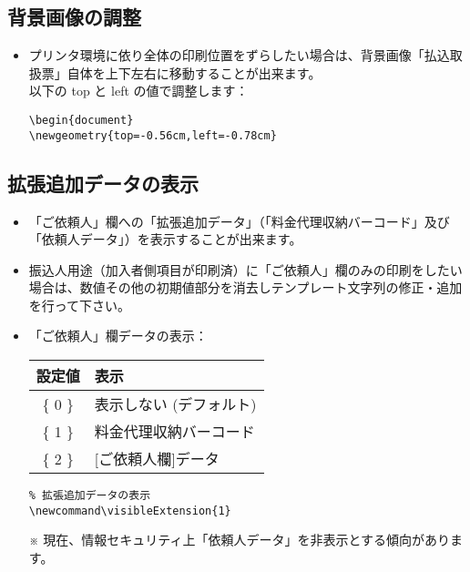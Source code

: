 \documentclass[a4paper,10pt,titlepage]{ltjsarticle}
\def\colH#1{\color[HTML]{#1}}
\newcommand\visibleExtension{1}
\begin{document}
\subsection{背景画像の調整}
\begin{itemize}
  \item プリンタ環境に依り全体の印刷位置をずらしたい場合は、背景画像「払込取扱票」自体を上下左右に移動することが出来ます。\\
以下の {\colH{800000} top} と {\colH{800000} left} の値で調整します：
\begin{verbatim}
\begin{document}
\newgeometry{top=-0.56cm,left=-0.78cm}
\end{verbatim}
  
\end{itemize}

\subsection{拡張追加データの表示}

\begin{itemize}
   \item 「ご依頼人」欄への「拡張追加データ」（「料金代理収納バーコード」及び「依頼人データ」）を表示することが出来ます。   
   \item 振込人用途（加入者側項目が印刷済）に「ご依頼人」欄のみの印刷をしたい場合は、数値その他の初期値部分を消去しテンプレート文字列の修正・追加を行って下さい。
   \item 「ご依頼人」欄データの表示：
   \item[] 
\vspace{2mm}
\begin{tabular}{|c|l|}
\hline
\bfseries{設定値} & \hspace{40pt}\bfseries{表示}\\
\hline
\{ 0 \} & 表示しない (デフォルト)\\
\hline
\{ 1 \} & 料金代理収納バーコード\\
\hline
\{ 2 \} & [ご依頼人欄]データ\\
\hline
\end{tabular}
\vspace{2mm}
              
\begin{verbatim}
% 拡張追加データの表示
\newcommand\visibleExtension{1}
\end{verbatim}

   \item[※] 現在、情報セキュリティ上「依頼人データ」を{\colH{800000}非表示}とする傾向があります。   

\end{itemize}
\end{document}
